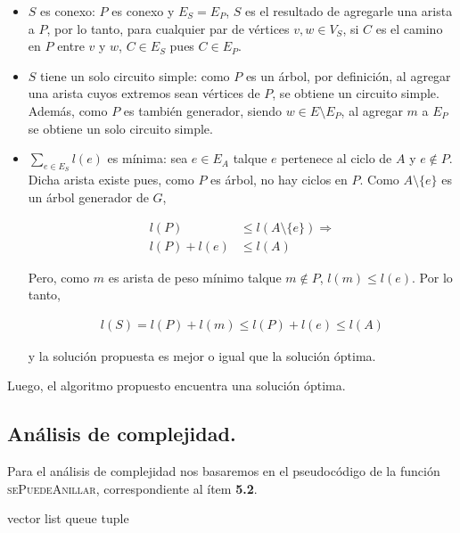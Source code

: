 \begin{itemize}
  \item $S$ es conexo: $P$ es conexo y $E_S = E_P$, $S$ es el resultado de
  agregarle una arista a $P$, por lo tanto, para cualquier par de vértices
  $v, w \in V_S$, si $C$ es el camino en $P$ entre $v$ y $w$, $C \in E_S$
  pues $C \in E_P$.

  \item $S$ tiene un solo circuito simple: como $P$ es un árbol, por
  definición, al agregar una arista cuyos extremos sean vértices de $P$, 
  se obtiene un circuito simple. Además, como $P$ es también generador, 
  siendo $w \in E \setminus E_P$, al agregar $m$ a $E_P$ se
  obtiene un solo circuito simple.

  \item $\sum\limits_{e \in E_S} l(e)$ es mínima: sea $e \in E_A$ talque $e$
  pertenece al ciclo de $A$ y $e \notin P$. Dicha arista existe pues, como
  $P$ es árbol, no hay ciclos en $P$. Como $A \setminus \{e\}$ es un árbol
  generador de $G$,

  \begin{align*}
    l(P) &\leq l(A \setminus \{e\}) \Rightarrow \\
    l(P) + l(e) &\leq l(A)
  \end{align*}

  Pero, como $m$ es arista de peso mínimo talque $m \notin P$, $l(m) \leq
  l(e)$. Por lo tanto,

  \begin{align*}
    l(S) = l(P) + l(m) \leq l(P) + l(e) \leq l(A)
  \end{align*}

  y la solución propuesta es mejor o igual que la solución óptima.

\end{itemize}

Luego, el algoritmo propuesto encuentra una solución óptima.


\newpage
\subsection{Análisis de complejidad.}

\vspace*{0.3cm}

Para el análisis de complejidad nos basaremos en el pseudocódigo de la función
\textsc{sePuedeAnillar}, correspondiente al ítem \textbf{5.2}.

vector
list
queue
tuple

